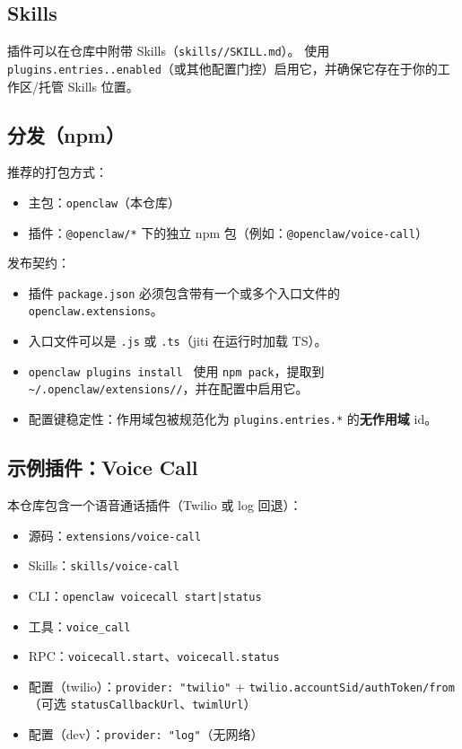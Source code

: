 \subsection{Skills}


插件可以在仓库中附带 Skills（\texttt{skills//SKILL.md}）。
使用 \texttt{plugins.entries..enabled}（或其他配置门控）启用它，并确保它存在于你的工作区/托管 Skills 位置。

\subsection{分发（npm）}


推荐的打包方式：

\begin{itemize}
  \item 主包：\texttt{openclaw}（本仓库）
  \item 插件：\texttt{@openclaw/*} 下的独立 npm 包（例如：\texttt{@openclaw/voice-call}）
\end{itemize}


发布契约：

\begin{itemize}
  \item 插件 \texttt{package.json} 必须包含带有一个或多个入口文件的 \texttt{openclaw.extensions}。
  \item 入口文件可以是 \texttt{.js} 或 \texttt{.ts}（jiti 在运行时加载 TS）。
  \item \texttt{openclaw plugins install } 使用 \texttt{npm pack}，提取到 \texttt{\textasciitilde{}/.openclaw/extensions//}，并在配置中启用它。
  \item 配置键稳定性：作用域包被规范化为 \texttt{plugins.entries.*} 的\textbf{无作用域} id。
\end{itemize}


\subsection{示例插件：Voice Call}


本仓库包含一个语音通话插件（Twilio 或 log 回退）：

\begin{itemize}
  \item 源码：\texttt{extensions/voice-call}
  \item Skills：\texttt{skills/voice-call}
  \item CLI：\texttt{openclaw voicecall start|status}
  \item 工具：\texttt{voice\_call}
  \item RPC：\texttt{voicecall.start}、\texttt{voicecall.status}
  \item 配置（twilio）：\texttt{provider: "twilio"} + \texttt{twilio.accountSid/authToken/from}（可选 \texttt{statusCallbackUrl}、\texttt{twimlUrl}）
  \item 配置（dev）：\texttt{provider: "log"}（无网络）
\end{itemize}



